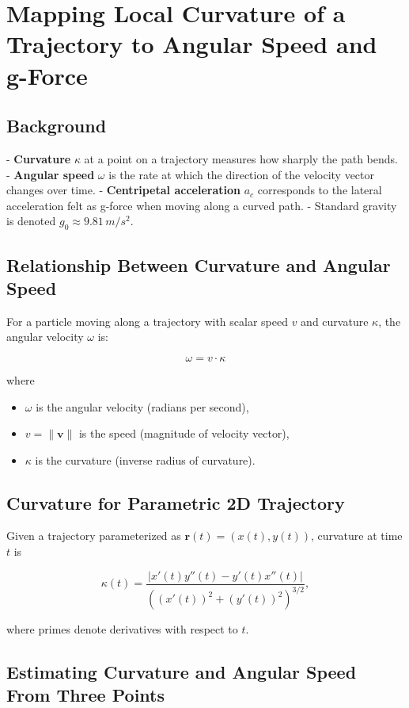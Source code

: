 \documentclass{article}
\begin{document}
	
	\section*{Mapping Local Curvature of a Trajectory to Angular Speed and g-Force}
	
	\subsection*{Background}
	
	- \textbf{Curvature} $\kappa$ at a point on a trajectory measures how sharply the path bends.
	- \textbf{Angular speed} $\omega$ is the rate at which the direction of the velocity vector changes over time.
	- \textbf{Centripetal acceleration} $a_c$ corresponds to the lateral acceleration felt as g-force when moving along a curved path.
	- Standard gravity is denoted $g_0 \approx 9.81\, m/s^2$.
	
	\subsection*{Relationship Between Curvature and Angular Speed}
	
	For a particle moving along a trajectory with scalar speed $v$ and curvature $\kappa$, the angular velocity $\omega$ is:
	
	\[
	\boxed{
		\omega = v \cdot \kappa
	}
	\]
	
	where
	\begin{itemize}
		\item $\omega$ is the angular velocity (radians per second),
		\item $v = \|\bm{v}\|$ is the speed (magnitude of velocity vector),
		\item $\kappa$ is the curvature (inverse radius of curvature).
	\end{itemize}
	
	\subsection*{Curvature for Parametric 2D Trajectory}
	
	Given a trajectory parameterized as $\bm{r}(t) = (x(t), y(t))$, curvature at time $t$ is
	
	\[
	\kappa(t) = \frac{|x'(t) y''(t) - y'(t) x''(t)|}{\left( (x'(t))^2 + (y'(t))^2 \right)^{3/2}},
	\]
	
	where primes denote derivatives with respect to $t$.
	
	\subsection*{Estimating Curvature and Angular Speed From Three Points}
	
\end{document}
